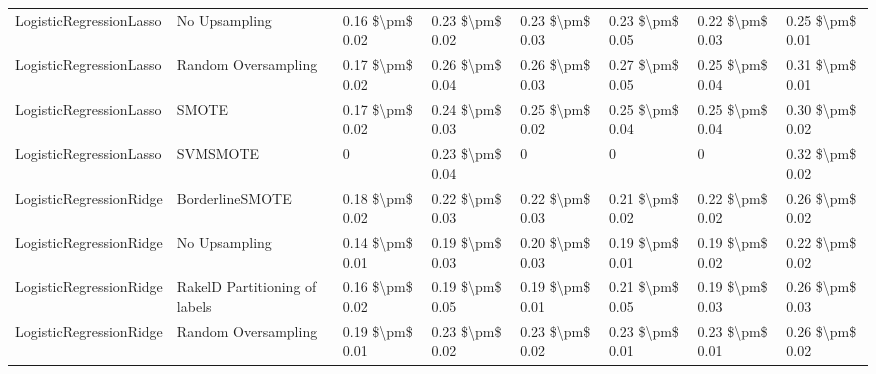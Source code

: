 \begin{tabular}{llllllll}
        LogisticRegressionLasso &                 No Upsampling & 0.16 \$\textbackslash pm\$ 0.02 &           0.23 \$\textbackslash pm\$ 0.02 &       0.23 \$\textbackslash pm\$ 0.03 &        0.23 \$\textbackslash pm\$ 0.05 &                         0.22 \$\textbackslash pm\$ 0.03 &     0.25 \$\textbackslash pm\$ 0.01 \\
        LogisticRegressionLasso &           Random Oversampling & 0.17 \$\textbackslash pm\$ 0.02 &           0.26 \$\textbackslash pm\$ 0.04 &       0.26 \$\textbackslash pm\$ 0.03 &        0.27 \$\textbackslash pm\$ 0.05 &                         0.25 \$\textbackslash pm\$ 0.04 &     0.31 \$\textbackslash pm\$ 0.01 \\
        LogisticRegressionLasso &                         SMOTE & 0.17 \$\textbackslash pm\$ 0.02 &           0.24 \$\textbackslash pm\$ 0.03 &       0.25 \$\textbackslash pm\$ 0.02 &        0.25 \$\textbackslash pm\$ 0.04 &                         0.25 \$\textbackslash pm\$ 0.04 &     0.30 \$\textbackslash pm\$ 0.02 \\
        LogisticRegressionLasso &                      SVMSMOTE &               0 &           0.23 \$\textbackslash pm\$ 0.04 &                     0 &                      0 &                                       0 &     0.32 \$\textbackslash pm\$ 0.02 \\
        LogisticRegressionRidge &               BorderlineSMOTE & 0.18 \$\textbackslash pm\$ 0.02 &           0.22 \$\textbackslash pm\$ 0.03 &       0.22 \$\textbackslash pm\$ 0.03 &        0.21 \$\textbackslash pm\$ 0.02 &                         0.22 \$\textbackslash pm\$ 0.02 &     0.26 \$\textbackslash pm\$ 0.02 \\
        LogisticRegressionRidge &                 No Upsampling & 0.14 \$\textbackslash pm\$ 0.01 &           0.19 \$\textbackslash pm\$ 0.03 &       0.20 \$\textbackslash pm\$ 0.03 &        0.19 \$\textbackslash pm\$ 0.01 &                         0.19 \$\textbackslash pm\$ 0.02 &     0.22 \$\textbackslash pm\$ 0.02 \\
        LogisticRegressionRidge & RakelD Partitioning of labels & 0.16 \$\textbackslash pm\$ 0.02 &           0.19 \$\textbackslash pm\$ 0.05 &       0.19 \$\textbackslash pm\$ 0.01 &        0.21 \$\textbackslash pm\$ 0.05 &                         0.19 \$\textbackslash pm\$ 0.03 &     0.26 \$\textbackslash pm\$ 0.03 \\
        LogisticRegressionRidge &           Random Oversampling & 0.19 \$\textbackslash pm\$ 0.01 &           0.23 \$\textbackslash pm\$ 0.02 &       0.23 \$\textbackslash pm\$ 0.02 &        0.23 \$\textbackslash pm\$ 0.01 &                         0.23 \$\textbackslash pm\$ 0.01 &     0.26 \$\textbackslash pm\$ 0.02 \\

\end{tabular}

